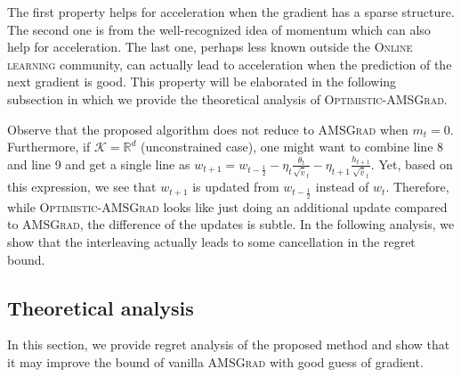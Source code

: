 \documentclass[11pt]{article}
\def\K{\mathcal{K}}
\theoremstyle{k}
\begin{document}
The first property helps for acceleration when the gradient has a sparse structure.
The second one is from the well-recognized idea of momentum which can also help for acceleration. The last one, perhaps less known outside the \textsc{Online learning} community, can actually lead to acceleration when the prediction of the next gradient is good. This property will be elaborated in the following subsection in which we provide the theoretical analysis of \textsc{Optimistic-AMSGrad}.


Observe that the proposed algorithm does not reduce to \textsc{AMSGrad} when $m_{t}=0$.
Furthermore, if $\K = \mathbb R^{d}$ (unconstrained case),
one might want to combine line 8 and line 9 and get a single line as $w_{t+1}=
w_{t-\frac{1}{2}} - \eta_t \frac{\theta_t}{ \sqrt{\hat{v}}_t } - \eta_{t+1} \frac{h_{t+1}}{ \sqrt{\hat{v}}_t }$. Yet,
based on this expression, we see that
$w_{t+1}$ is updated from $w_{t-\frac{1}{2}}$
instead of $w_t$. Therefore, while \textsc{Optimistic-AMSGrad} looks like just doing an additional update compared to \textsc{AMSGrad}, the difference of the updates is subtle.
In the following analysis, we show that the interleaving actually leads to some cancellation in the regret bound.



\subsection{Theoretical analysis}
In this section, we provide regret analysis of the proposed method and show that it may improve the bound of vanilla \textsc{AMSGrad} with good guess of gradient.
\end{document}
